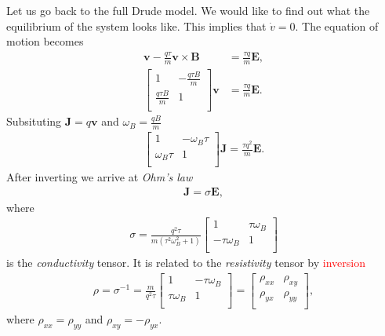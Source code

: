         Let us go back to the full Drude model. We would like to find out what the equilibrium of the system looks like. This implies that $\dot{v} =0$. The equation of motion becomes 
        \begin{align}
            \bm{v} - \frac{q \tau}{m}\bm{v}\times\bm{B}  &=\frac{\tau q}{m} \bm{E} ,\\
            \begin{bmatrix}
                1 & -\frac{q \tau B}{m} \\
                \frac{q \tau B}{m} & 1 \\
            \end{bmatrix} \bm{v} &= \frac{\tau q}{m} \bm{E}.
        \end{align}
        Subsituting $\bm{J} = q \bm{v}$ and $\omega_B = \frac{q B}{m}$
        \begin{align}
            \begin{bmatrix}
                1 & -\omega_B \tau \\
                \omega_B \tau & 1 \\
            \end{bmatrix}\bm{J} = \frac{\tau q^2}{m} \bm{E}.
        \end{align}
        After inverting we arrive at \textit{Ohm's law}
        \begin{align}
            \bm{J}=\sigma \bm{E}, \label{Ohms_Law}
        \end{align}
        where
        \begin{align}
            \sigma=\frac{q^2 \tau }{m \left(\tau ^2 \omega_B ^2+1\right)}
\begin{bmatrix}
 1 & \tau  \omega_B  \\
 -\tau  \omega_B  & 1 \\
\end{bmatrix}
        \end{align}
         is the \textit{conductivity} tensor. It is related to the \textit{resistivity} tensor by \textcolor{red}{inversion}
         \begin{align}
            \rho = \sigma^{-1}= \frac{m}{q^2 \tau } \begin{bmatrix}
 1 & -\tau  \omega_B  \\
 \tau  \omega_B  & 1 \\
            \end{bmatrix} = \begin{bmatrix}
                \rho_{xx} & \rho_{xy} \\
                \rho_{yx} & \rho_{yy} \\
            \end{bmatrix},
         \end{align}
         where $\rho_{xx} =\rho_{yy}$ and $\rho_{xy} = - \rho_{yx}$.

